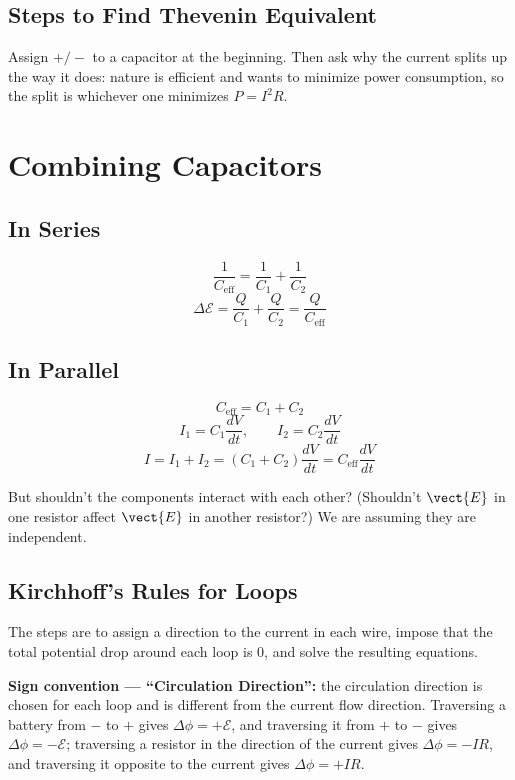\subsection{Steps to Find Thevenin Equivalent}

Assign $+/-$ to a capacitor at the beginning. Then ask why the current splits up the way it does: nature is efficient and wants to minimize power consumption, so the split is whichever one minimizes $P = I^2 R$.


\section{Combining Capacitors}

\subsection{In Series}

\[
    \frac{1}{C_\text{eff}} = \frac{1}{C_1} + \frac{1}{C_2}
\]
\[
    \Delta\mathcal{E} = \frac{Q}{C_1} + \frac{Q}{C_2} = \frac{Q}{C_\text{eff}}
\]

\subsection{In Parallel}

\[
    C_\text{eff} = C_1 + C_2
\]
\[
    I_1 = C_1\frac{dV}{dt}, \qquad I_2 = C_2\frac{dV}{dt}
\]
\[
    I = I_1 + I_2 = (C_1+C_2)\frac{dV}{dt} = C_\text{eff}\frac{dV}{dt}
\]

\begin{fact}
But shouldn't the components interact with each other? (Shouldn't $\vect{E}$ in one resistor affect $\vect{E}$ in another resistor?) We are assuming they are independent.
\end{fact}

\subsection{Kirchhoff's Rules for Loops}

The steps are to assign a direction to the current in each wire, impose that the total potential drop around each loop is 0, and solve the resulting equations.

\textbf{Sign convention --- ``Circulation Direction'':} the circulation direction is chosen for each loop and is different from the current flow direction. Traversing a battery from $-$ to $+$ gives $\Delta\phi = +\mathcal{E}$, and traversing it from $+$ to $-$ gives $\Delta\phi = -\mathcal{E}$; traversing a resistor in the direction of the current gives $\Delta\phi = -IR$, and traversing it opposite to the current gives $\Delta\phi = +IR$.

